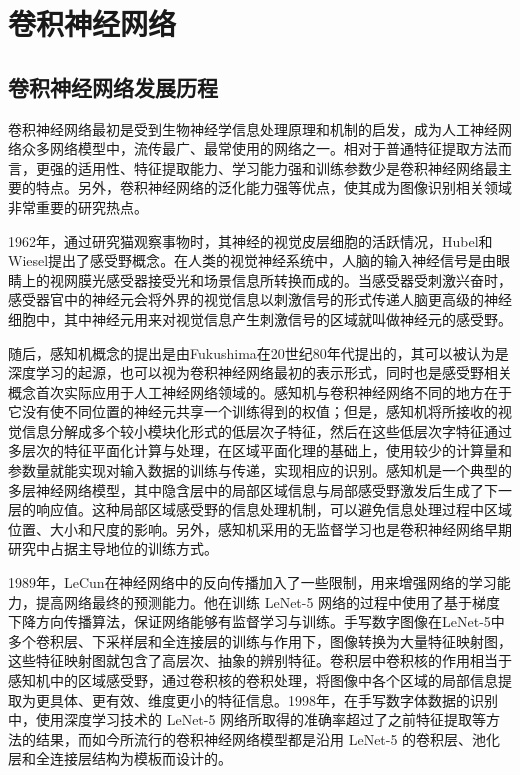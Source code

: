 \section{卷积神经网络}

\subsection{卷积神经网络发展历程}
卷积神经网络最初是受到生物神经学信息处理原理和机制的启发，成为人工神经网络众多网络模型中，流传最广、最常使用的网络之一。相对于普通特征提取方法而言，更强的适用性、特征提取能力、学习能力强和训练参数少是卷积神经网络最主要的特点。另外，卷积神经网络的泛化能力强等优点，使其成为图像识别相关领域非常重要的研究热点。

1962年，通过研究猫观察事物时，其神经的视觉皮层细胞的活跃情况，Hubel和Wiesel提出了感受野概念\cite{hubel1968receptive}。在人类的视觉神经系统中，人脑的输入神经信号是由眼睛上的视网膜光感受器接受光和场景信息所转换而成的。当感受器受刺激兴奋时，感受器官中的神经元会将外界的视觉信息以刺激信号的形式传递人脑更高级的神经细胞中，其中神经元用来对视觉信息产生刺激信号的区域就叫做神经元的感受野。

随后，感知机概念的提出是由Fukushima在20世纪80年代提出的\cite{fukushima1980neocognitron}，其可以被认为是深度学习的起源，也可以视为卷积神经网络最初的表示形式，同时也是感受野相关概念首次实际应用于人工神经网络领域的。感知机与卷积神经网络不同的地方在于它没有使不同位置的神经元共享一个训练得到的权值；但是，感知机将所接收的视觉信息分解成多个较小模块化形式的低层次子特征，然后在这些低层次字特征通过多层次的特征平面化计算与处理，在区域平面化理的基础上，使用较少的计算量和参数量就能实现对输入数据的训练与传递，实现相应的识别。感知机是一个典型的多层神经网络模型，其中隐含层中的局部区域信息与局部感受野激发后生成了下一层的响应值。这种局部区域感受野的信息处理机制，可以避免信息处理过程中区域位置、大小和尺度的影响。另外，感知机采用的无监督学习也是卷积神经网络早期研究中占据主导地位的训练方式。 

1989年，LeCun在神经网络中的反向传播加入了一些限制，用来增强网络的学习能力，提高网络最终的预测能力\cite{lecun1998gradient}。他在训练 LeNet-5 网络的过程中使用了基于梯度下降方向传播算法，保证网络能够有监督学习与训练。手写数字图像在LeNet-5中多个卷积层、下采样层和全连接层的训练与作用下，图像转换为大量特征映射图，这些特征映射图就包含了高层次、抽象的辨别特征。卷积层中卷积核的作用相当于感知机中的区域感受野，通过卷积核的卷积处理，将图像中各个区域的局部信息提取为更具体、更有效、维度更小的特征信息。1998年，在手写数字体数据的识别中，使用深度学习技术的 LeNet-5 网络所取得的准确率超过了之前特征提取等方法的结果，而如今所流行的卷积神经网络模型都是沿用 LeNet-5 的卷积层、池化层和全连接层结构为模板而设计的。 

